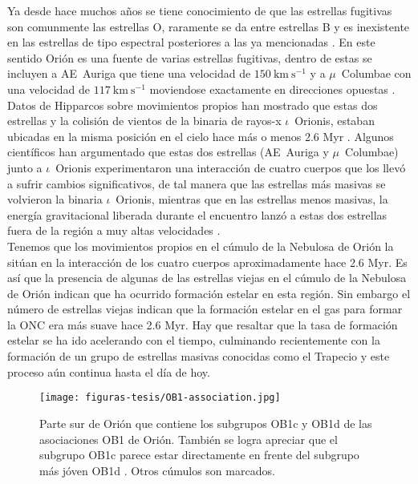 Ya desde hace muchos años se tiene conocimiento de que las estrellas fugitivas son comunmente las estrellas O, raramente se da entre estrellas B y es inexistente en las estrellas de tipo espectral posteriores a las ya mencionadas \citep{Gies:1986, Gies:1987}. En este sentido Orión es una fuente de varias estrellas fugitivas, dentro de estas se incluyen a AE~Auriga que tiene una velocidad de \(150~\text{km}~\text{s}^{-1}\)  y a \(\mu\)~Columbae con una velocidad de \(117~\text{km}~\text{s}^{-1}\) moviendose exactamente en direcciones opuestas \citep{Blaauw:1991}. Datos de Hipparcos sobre movimientos propios han mostrado que estas dos estrellas y la colisión de vientos de la binaria de rayos-x \(\iota\)~Orionis, estaban ubicadas en la misma posición en el cielo hace más o menos 2.6 Myr \citep{Hoogerwerf:2001}. Algunos científicos han argumentado que estas dos estrellas (AE~Auriga y \(\mu\)~Columbae) junto a \(\iota\)~Orionis experimentaron una interacción de cuatro cuerpos que los llevó a sufrir cambios significativos, de tal manera que las estrellas más masivas se volvieron la binaria \(\iota\)~Orionis, mientras que en las estrellas menos masivas, la energía gravitacional liberada durante el encuentro lanzó a estas dos estrellas fuera de la región a muy altas velocidades \citep{Gualandris:2004}.\\   

Tenemos que los movimientos propios en el cúmulo de la Nebulosa de Orión la sitúan en la interacción de los cuatro cuerpos aproximadamente hace 2.6 Myr. Es así que la presencia de algunas de las estrellas viejas en el cúmulo de la Nebulosa de Orión indican que ha ocurrido formación estelar en esta región. Sin embargo el número de estrellas viejas indican que la formación estelar en el gas para formar la ONC era más suave hace 2.6 Myr. Hay que resaltar que la tasa de formación estelar se ha ido acelerando con el tiempo, culminando recientemente con la formación de un grupo de estrellas masivas conocidas como el Trapecio y este proceso aún continua hasta el día de hoy.\\

\begin{figure}
  \centering
  \texttt{[image: figuras-tesis/OB1-association.jpg]}
  \caption{Parte sur de  Orión que contiene los subgrupos OB1c y OB1d de las asociaciones OB1 de Orión. También se logra apreciar que el subgrupo OB1c parece estar directamente en frente del subgrupo más jóven OB1d \citep{Bally:2008a}. Otros cúmulos son marcados.}
  \label{fig:OB1-association}
\end{figure}
  
